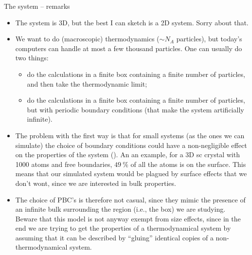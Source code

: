 \documentclass[10pt, compress, protectframetitle, handout]{beamer}
\begin{document}
\begin{frame}[allowframebreaks]{The system -- remarks}
	
	\begin{itemize}
		\item The system is 3D, but the best I can sketch is a 2D system. Sorry about that.
		\item We want to do (macroscopic) thermodynamics ($\sim N_A$ particles), but today's computers can handle at most a few thousand particles. One can usually do two things:
		\begin{itemize}
			\item do the calculations in a \alert{finite box} containing a \alert{finite number} of particles, and then take the thermodynamic limit;
			\item do the calculations in a \alert{finite box} containing a \alert{finite number} of particles, but with \alert{periodic boundary conditions} (that make the system artificially infinite).
		\end{itemize}
		\item The problem with the first way is that for small systems (as the ones we can simulate) the choice of boundary conditions could have a non-negligible effect on the properties of the system (\cite{Frenkel2002}). An an example, for a 3D sc crystal with 1000 atoms and free boundaries, $\SI{49}{\percent}$ of all the atoms is on the surface. This means that our simulated system would be plagued by surface effects that we don't wont, since we are interested in \alert{bulk properties}.
		\item The choice of PBC's is therefore not casual, since they mimic the presence of an infinite bulk surrounding the region (i.e., the box) we are studying. Beware that this model is not anyway exempt from size effects, since in the end we are trying to get the properties of a thermodynamical system by assuming that it can be described by ``gluing'' \alert{identical copies} of a non-thermodynamical system.
	\end{itemize}
	
\end{frame}
\end{document}
